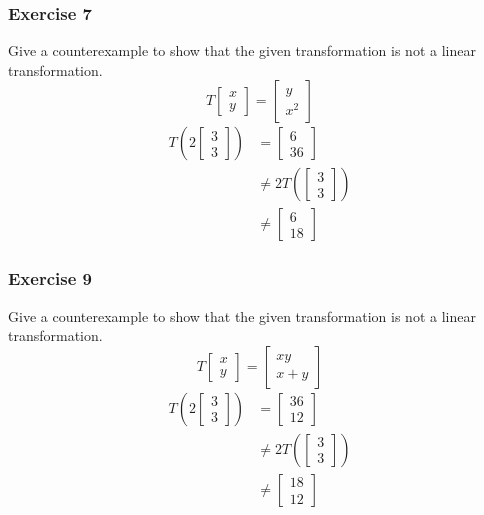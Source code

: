 \documentclass{math}
\begin{document}
\subsubsection*{Exercise 7}
Give a counterexample to show that the given transformation is not a linear
transformation.
\[ T\begin{bmatrix}x \\ y\end{bmatrix} = \begin{bmatrix}y \\ x^2\end{bmatrix} \]
\begin{align*}
  T\left(2\begin{bmatrix}3 \\ 3\end{bmatrix}\right) &=
    \begin{bmatrix}6 \\ 36\end{bmatrix} \\
  &\ne 2T\left(\begin{bmatrix}3 \\ 3\end{bmatrix}\right) \\
  &\ne \begin{bmatrix}6 \\ 18\end{bmatrix}
\end{align*}

\subsubsection*{Exercise 9}
Give a counterexample to show that the given transformation is not a linear
transformation.
\[ T\begin{bmatrix}x \\ y\end{bmatrix} =
  \begin{bmatrix}xy \\ x+y\end{bmatrix} \]
\begin{align*}
  T\left(2\begin{bmatrix}3 \\ 3\end{bmatrix}\right) &=
    \begin{bmatrix}36 \\ 12\end{bmatrix} \\
  &\ne 2T\left(\begin{bmatrix}3 \\ 3\end{bmatrix}\right) \\
  &\ne \begin{bmatrix}18 \\ 12\end{bmatrix}
\end{align*}
\end{document}

